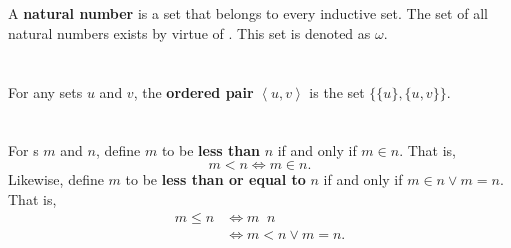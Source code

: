\documentclass{report}
\newcommand{\pair}[1]{\left< #1 \right>}
\begin{document}
\begin{definition}


\end{definition}

\section{}%

A \textbf{natural number} is a set that belongs to every inductive set.
The set of all natural numbers exists by virtue of .
This set is denoted as $\omega$.

\begin{definition}


\end{definition}

\section{}%

For any sets $u$ and $v$, the \textbf{ordered pair} $\pair{u, v}$ is
  the set $\{\{u\}, \{u, v\}\}$.

\begin{definition}

  \statementpadding



\end{definition}

\section{}%

For s $m$ and $n$, define $m$ to be
  \textbf{less than} $n$ if and only if $m \in n$.
That is, $$m < n \iff m \in n.$$
Likewise, define $m$ to be \textbf{less than or equal to} $n$ if and only if
  $m \in n \lor m = n$.
That is,
  \begin{align*}
    m \leq n
      & \iff m \mathop{\underline{\in}} n \\
      & \iff m < n \lor m = n.
  \end{align*}
\end{document}

